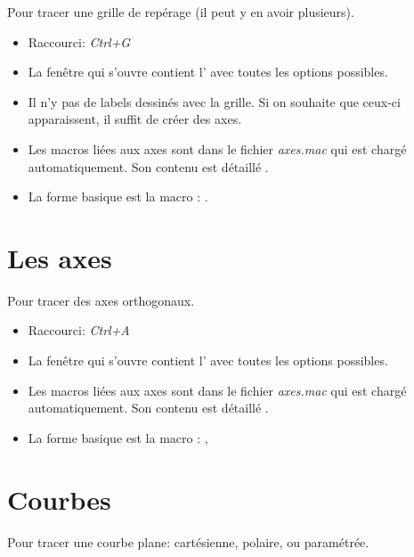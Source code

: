 Pour tracer une grille de repérage (il peut y en avoir plusieurs).

\begin{itemize}
\item Raccourci: \textsl{Ctrl+G}
\item La fenêtre qui s'ouvre contient l' avec toutes les options possibles.
\item Il n'y pas de labels dessinés avec la grille. Si on souhaite que ceux-ci apparaissent, il suffit de créer des axes.
\item Les macros liées aux axes sont dans le fichier \textit{axes.mac} qui est chargé automatiquement. Son contenu est détaillé .
\item La forme basique est la macro : .
\end{itemize}

\section{Les axes}

Pour tracer des axes orthogonaux.

\begin{itemize}
\item Raccourci: \textsl{Ctrl+A}
\item La fenêtre qui s'ouvre contient l' avec toutes les options possibles.
\item Les macros liées aux axes sont dans le fichier \textit{axes.mac} qui est chargé automatiquement. Son contenu est détaillé .
\item La forme basique est la macro : ,
\end{itemize}


\section{Courbes}

Pour tracer une courbe plane: cartésienne, polaire, ou paramétrée.

